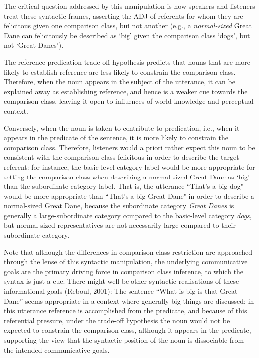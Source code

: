 The critical question addressed by this manipulation is how speakers and listeners treat these syntactic frames, asserting the ADJ of referents for whom they are felicitous given one comparison class, but not another (e.g., a \emph{normal-sized} Great Dane can felicitously be described as ‘big’ given the comparison class ‘dogs’, but not ‘Great Danes’). 

The reference-predication trade-off hypothesis predicts that nouns that are more likely to establish reference are less likely to constrain the comparison class. Therefore, when the noun appears in the subject of the utterance, it can be explained away as establishing reference, and hence is a weaker cue towards the comparison class, leaving it open to influences of world knowledge and perceptual context. 

 Conversely, when the noun is taken to contribute to predication, i.e., when it appears in the predicate of the sentence, it is more likely to constrain the comparison class. Therefore, listeners would a priori rather expect this noun to be consistent with the comparison class felicitous in order to describe the target referent: for instance, the basic-level category label would be more appropriate for setting the comparison class when describing a normal-sized Great Dane as ‘big’ than the subordinate category label. That is, the utterance ``That's a big dog" would be more appropriate than ``That's a big Great Dane" in order to describe a normal-sized Great Dane, because the subordinate category \emph{Great Danes} is generally a large-subordinate category compared to the basic-level category \emph{dogs}, but normal-sized representatives are not necessarily large compared to their subordinate category. 

Note that although the differences in comparison class restriction are approached through the lense of this syntactic manipulation, the underlying communicative goals are the primary driving force in comparison class inference, to which the syntax is just a cue. 
There might well be other syntactic realisations of these informational goals (Reboul, 2001): The sentence “What is big is that Great Dane” seems appropriate in a context where generally big things are discussed; in this utterance reference is accomplished from the predicate, and because of this referential pressure, under the trade-off hypothesis the noun would not be expected to constrain the comparison class, although it appears in the predicate, supporting the view that the syntactic position of the noun is dissociable from the intended communicative goals.

